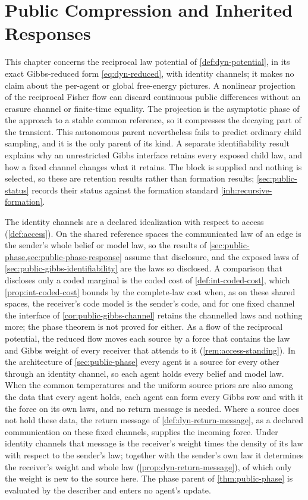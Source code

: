 \chapter{Public Compression and Inherited Responses}
\label{ch:public-compression}

This chapter concerns the reciprocal law potential of \cref{def:dyn-potential}, in its exact Gibbs-reduced form \cref{eq:dyn-reduced}, with identity channels; it makes no claim about the per-agent or global free-energy pictures. A nonlinear projection of the reciprocal Fisher flow can discard continuous public differences without an erasure channel or finite-time equality. The projection is the asymptotic phase of the approach to a stable common reference, so it compresses the decaying part of the transient. This autonomous parent nevertheless fails to predict ordinary child sampling, and it is the only parent of its kind. A separate identifiability result explains why an unrestricted Gibbs interface retains every exposed child law, and how a fixed channel changes what it retains. The block is supplied and nothing is selected, so these are retention results rather than formation results; \cref{sec:public-status} records their status against the formation standard \cref{inh:recursive-formation}.

The identity channels are a declared idealization with respect to access (\cref{def:access}). On the shared reference spaces the communicated law of an edge is the sender's whole belief or model law, so the results of \cref{sec:public-phase,sec:public-phase-response} assume that disclosure, and the exposed laws of \cref{sec:public-gibbs-identifiability} are the laws so disclosed. A comparison that discloses only a coded marginal is the coded cost of \cref{def:int-coded-cost}, which \cref{prop:int-coded-cost} bounds by the complete-law cost when, as on these shared spaces, the receiver's code model is the sender's code, and for one fixed channel the interface of \cref{cor:public-gibbs-channel} retains the channelled laws and nothing more; the phase theorem is not proved for either. As a flow of the reciprocal potential, the reduced flow moves each source by a force that contains the law and Gibbs weight of every receiver that attends to it (\cref{rem:access-standing}). In the architecture of \cref{sec:public-phase} every agent is a source for every other through an identity channel, so each agent holds every belief and model law. When the common temperatures and the uniform source priors are also among the data that every agent holds, each agent can form every Gibbs row and with it the force on its own laws, and no return message is needed. Where a source does not hold these data, the return message of \cref{def:dyn-return-message}, as a declared communication on these fixed channels, supplies the incoming force. Under identity channels that message is the receiver's weight times the density of its law with respect to the sender's law; together with the sender's own law it determines the receiver's weight and whole law (\cref{prop:dyn-return-message}), of which only the weight is new to the source here. The phase parent of \cref{thm:public-phase} is evaluated by the describer and enters no agent's update.

